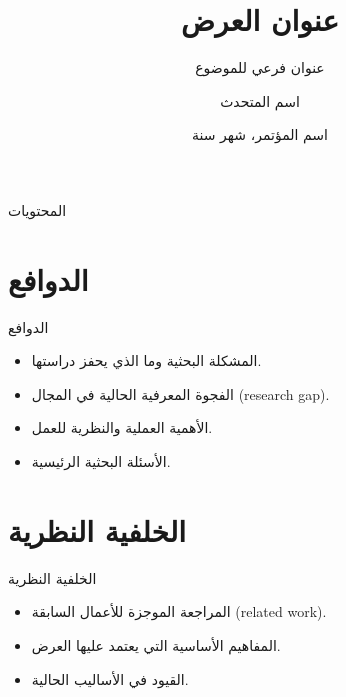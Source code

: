 \documentclass[aspectratio=169,11pt]{beamer}
\title{عنوان العرض}
\subtitle{عنوان فرعي للموضوع}
\author{اسم المتحدث}
\institute{الجامعة}
\date{اسم المؤتمر، شهر سنة}
\let\textEN\textenglish
\begin{document}
\begin{frame}[plain]
\titlepage
\end{frame}

\begin{frame}{المحتويات}
\tableofcontents
\end{frame}

\section{الدوافع}
\begin{frame}{الدوافع}
\begin{itemize}
  \item المشكلة البحثية وما الذي يحفز دراستها.
  \item الفجوة المعرفية الحالية في المجال \textEN{(research gap)}.
  \item الأهمية العملية والنظرية للعمل.
  \item الأسئلة البحثية الرئيسية.
\end{itemize}
\end{frame}

\section{الخلفية النظرية}
\begin{frame}{الخلفية النظرية}
\begin{itemize}
  \item المراجعة الموجزة للأعمال السابقة \textEN{(related work)}.
  \item المفاهيم الأساسية التي يعتمد عليها العرض.
  \item القيود في الأساليب الحالية.
\end{itemize}
\end{frame}

\end{document}
